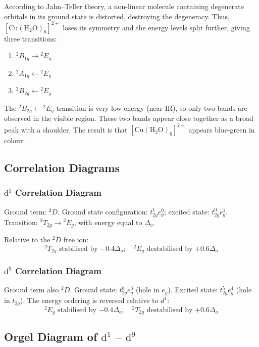 \documentclass[12pt,a4paper]{article}
\begin{document}
According to Jahn--Teller theory, a non-linear molecule containing degenerate orbitals in its ground state is distorted, destroying the degeneracy. Thus, $[\mathrm{Cu(H_2O)_6}]^{2+}$ loses its symmetry and the energy levels split further, giving three transitions:
\begin{enumerate}
  \item ${}^2B_{1g} \to {}^2E_g$
  \item ${}^2A_{1g} \leftarrow {}^2E_g$
  \item ${}^2B_{2g} \leftarrow {}^2E_g$
\end{enumerate}

The ${}^2B_{2g} \leftarrow {}^2E_g$ transition is very low energy (near IR), so only two bands are observed in the visible region. These two bands appear close together as a broad peak with a shoulder. The result is that $[\mathrm{Cu(H_2O)_6}]^{2+}$ appears blue-green in colour.

\subsection{Correlation Diagrams}

\subsubsection{$\mathrm{d}^1$ Correlation Diagram}

Ground term: ${}^2D$. Ground state configuration: $t_{2g}^1 e_g^0$; excited state: $t_{2g}^0 e_g^1$.
Transition: ${}^2T_{2g} \to {}^2E_g$, with energy equal to $\Delta_o$.

Relative to the ${}^2D$ free ion:
\[
{}^2T_{2g} \text{ stabilised by } {-0.4\Delta_o}; \quad {}^2E_g \text{ destabilised by } {+0.6\Delta_o}
\]

\subsubsection{$\mathrm{d}^9$ Correlation Diagram}

Ground term also ${}^2D$. Ground state: $t_{2g}^6 e_g^3$ (hole in $e_g$). Excited state: $t_{2g}^5 e_g^4$ (hole in $t_{2g}$). The energy ordering is reversed relative to $d^1$:
\[
{}^2E_g \text{ stabilised by } {-0.4\Delta_o}; \quad {}^2T_{2g} \text{ destabilised by } {+0.6\Delta_o}
\]

\subsection{Orgel Diagram of $\mathrm{d}^1$ -- $\mathrm{d}^9$}
\end{document}
